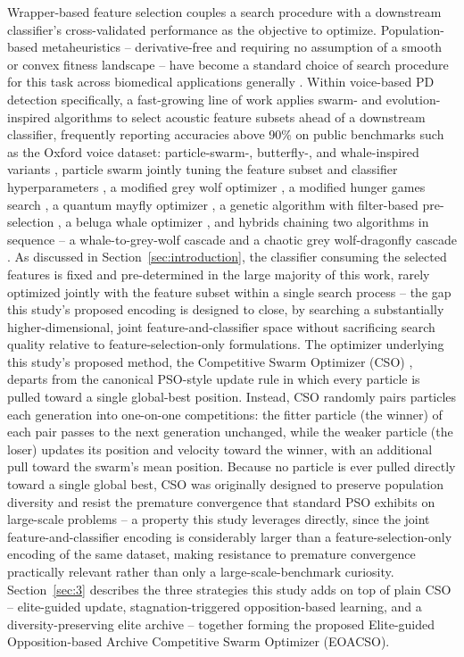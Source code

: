 Wrapper-based feature selection couples a search procedure with a
downstream classifier's cross-validated performance as the objective to
optimize. Population-based metaheuristics -- derivative-free and
requiring no assumption of a smooth or convex fitness landscape -- have
become a standard choice of search procedure for this task across
biomedical applications generally \cite{BarreraGarcia:2023}. Within
voice-based PD detection specifically, a fast-growing line of work applies
swarm- and evolution-inspired algorithms to select acoustic feature
subsets ahead of a downstream classifier, frequently reporting accuracies
above 90\% on public benchmarks such as the Oxford voice dataset:
particle-swarm-, butterfly-, and whale-inspired variants
\cite{Hashemi:2026}, particle swarm jointly tuning the feature subset and
classifier hyperparameters \cite{Eliwa:2025}, a modified grey wolf
optimizer \cite{Santhosh:2025}, a modified hunger games search
\cite{Hashim:2023}, a quantum mayfly optimizer \cite{Mansour:2024}, a
genetic algorithm with filter-based pre-selection \cite{Ali:2023}, a
beluga whale optimizer \cite{Ganesan:2025}, and hybrids chaining two
algorithms in sequence -- a whale-to-grey-wolf cascade
\cite{AlNajjar:2024} and a chaotic grey wolf-dragonfly cascade
\cite{Appati:2026}. As discussed in Section~\ref{sec:introduction}, the
classifier consuming the selected features is fixed and pre-determined in
the large majority of this work, rarely optimized jointly with the
feature subset within a single search process -- the gap this study's
proposed encoding is designed to close, by searching a substantially
higher-dimensional, joint feature-and-classifier space without
sacrificing search quality relative to feature-selection-only
formulations. The optimizer underlying this study's proposed method, the
Competitive Swarm Optimizer (CSO) \cite{Cheng:2015}, departs from the
canonical PSO-style update rule in which every particle is pulled toward a
single global-best position. Instead, CSO randomly pairs particles each
generation into one-on-one competitions: the fitter particle (the winner)
of each pair passes to the next generation unchanged, while the weaker
particle (the loser) updates its position and velocity toward the winner,
with an additional pull toward the swarm's mean position. Because no
particle is ever pulled directly toward a single global best, CSO was
originally designed to preserve population diversity and resist the
premature convergence that standard PSO exhibits on large-scale problems
-- a property this study leverages directly, since the joint
feature-and-classifier encoding is considerably larger than a
feature-selection-only encoding of the same dataset, making resistance to
premature convergence practically relevant rather than only a
large-scale-benchmark curiosity. Section~\ref{sec:3} describes the
three strategies this study adds on top of plain CSO -- elite-guided
update, stagnation-triggered opposition-based learning, and a
diversity-preserving elite archive -- together forming the proposed
Elite-guided Opposition-based Archive Competitive Swarm Optimizer
(EOACSO).
